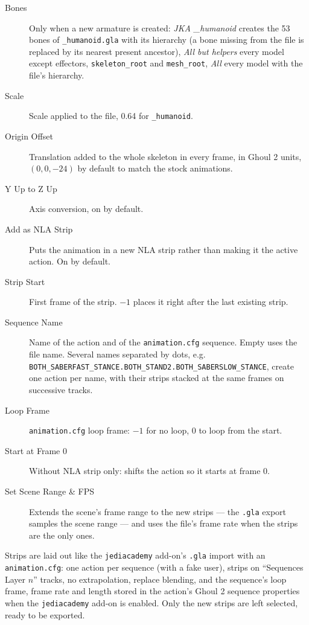 \documentclass[a4paper,10pt]{article}
\begin{document}
 \begin{description}
  \item[Bones] Only when a new armature is created: \emph{JKA \_humanoid} creates the 53 bones of
  \texttt{\_humanoid.gla} with its hierarchy (a bone missing from the file is replaced by its nearest
  present ancestor), \emph{All but helpers} every model except effectors, \texttt{skeleton\_root} and
  \texttt{mesh\_root}, \emph{All} every model with the file's hierarchy.
  \item[Scale] Scale applied to the file, 0.64 for \texttt{\_humanoid}.
  \item[Origin Offset] Translation added to the whole skeleton in every frame, in Ghoul 2 units,
  $(0, 0, -24)$ by default to match the stock animations.
  \item[Y Up to Z Up] Axis conversion, on by default.
  \item[Add as NLA Strip] Puts the animation in a new NLA strip rather than making it the active
  action. On by default.
  \item[Strip Start] First frame of the strip. $-1$ places it right after the last existing strip.
  \item[Sequence Name] Name of the action and of the \texttt{animation.cfg} sequence. Empty uses the
  file name. Several names separated by dots, e.g.
  \texttt{BOTH\_SABERFAST\_STANCE.BOTH\_STAND2.BOTH\_SABERSLOW\_STANCE}, create one action per name,
  with their strips stacked at the same frames on successive tracks.
  \item[Loop Frame] \texttt{animation.cfg} loop frame: $-1$ for no loop, 0 to loop from the start.
  \item[Start at Frame 0] Without NLA strip only: shifts the action so it starts at frame 0.
  \item[Set Scene Range \& FPS] Extends the scene's frame range to the new strips --- the
  \texttt{.gla} export samples the scene range --- and uses the file's frame rate when the strips are
  the only ones.
 \end{description}

 Strips are laid out like the \texttt{jediacademy} add-on's \texttt{.gla} import with an
 \texttt{animation.cfg}: one action per sequence (with a fake user), strips on
 ``Sequences Layer $n$'' tracks, no extrapolation, replace blending, and the sequence's loop frame,
 frame rate and length stored in the action's Ghoul 2 sequence properties when the
 \texttt{jediacademy} add-on is enabled. Only the new strips are left selected, ready to be exported.
\end{document}
